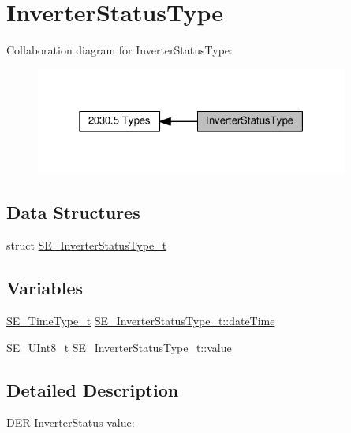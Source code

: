 \hypertarget{group__InverterStatusType}{}\section{Inverter\+Status\+Type}
\label{group__InverterStatusType}
Collaboration diagram for Inverter\+Status\+Type\+:\nopagebreak
\begin{figure}[H]
\begin{center}
\leavevmode
\includegraphics[width=292pt]{group__InverterStatusType}
\end{center}
\end{figure}
\subsection*{Data Structures}
\begin{DoxyCompactItemize}
\item 
struct \hyperlink{structSE__InverterStatusType__t}{S\+E\+\_\+\+Inverter\+Status\+Type\+\_\+t}
\end{DoxyCompactItemize}
\subsection*{Variables}
\begin{DoxyCompactItemize}
\item 
\hyperlink{group__TimeType_ga6fba87a5b57829b4ff3f0e7638156682}{S\+E\+\_\+\+Time\+Type\+\_\+t} \hyperlink{group__InverterStatusType_ga87657492474108fe3e58f3e8ac2a5e8d}{S\+E\+\_\+\+Inverter\+Status\+Type\+\_\+t\+::date\+Time}
\item 
\hyperlink{group__UInt8_gaf7c365a1acfe204e3a67c16ed44572f5}{S\+E\+\_\+\+U\+Int8\+\_\+t} \hyperlink{group__InverterStatusType_ga2e5ea03a4944948d5ab06b26e1be0bd3}{S\+E\+\_\+\+Inverter\+Status\+Type\+\_\+t\+::value}
\end{DoxyCompactItemize}


\subsection{Detailed Description}
D\+ER Inverter\+Status value\+:

